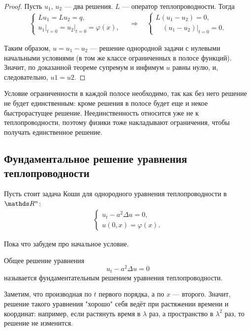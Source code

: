 \begin{proof}
Пусть $u_1, \, u_2 $ --- два решения. $L$ --- оператор теплопроводности.  Тогда
\begin{align*}
	\begin{cases*}
		Lu_1 = Lu_2 = q, \\
		u_1\Big\rvert_{t=0} = u_2\Big\rvert_{t=0} = \varphi(x),
	\end{cases*}
	\quad \Rightarrow \quad
	\begin{cases*}
		L(u_1 - u_2) = 0, \\
		\quad (u_1-u_2) \Big\rvert_{t=0}=0.
	\end{cases*}
\end{align*}

Таким образом, $u = u_1 - u_2$ --- решение однородной задачи с нулевыми начальными условиями (в том же классе ограниченных в полосе функций). Значит, по доказанной теореме супремум и инфимум $u$ равны нулю, и, следовательно, $u1 = u2$.

\end{proof}

\begin{note}
Условие ограниченности в каждой полосе необходимо, так как без него решение не будет единственным: кроме решения в полосе будет еще и некое быстрорастущее решение. Неединственность относится уже не к теплопроводности, поэтому физики тоже накладывают ограничения, чтобы получать единственное решение.
\end{note}


\subsection{Фундаментальное решение уравнения теплопроводности}
Пусть стоит задача Коши для однородного уравнения теплопроводности в $\real^n$:
\begin{align*}
	\begin{cases*}
		u_t - a^2 \Delta u = 0, \\
		u(0,x) = \varphi(x).
	\end{cases*}
\end{align*}

Пока что забудем про начальное условие.

\begin{definition} Общее решение уравнения
$$ u_t - a^2 \Delta u = 0$$
называется фундаментательным решением уравнения теплопроводности.
\end{definition}

Заметим, что производная по $t$ первого порядка, а по $x$ --- второго. Значит, решение такого уравнения "хорошо" себя ведёт при растяжении времени и координат: например, если растянуть время в $\lambda$ раз, а пространство в $\lambda^2$ раз, то решение не изменится.

